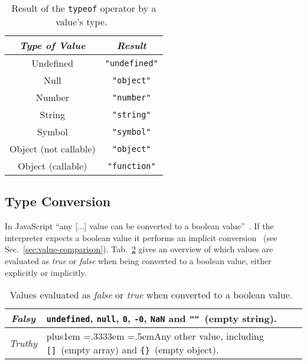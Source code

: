 \begin{table}[h]
\caption{Result of the \texttt{typeof} operator by a value's type.~\cite[p.~164]{ES6Spec:Ecma:2015}}
\label{tab:typeof}
\centering
  \setlength{\tabcolsep}{5mm}
  \def\arraystretch{1.25}
  \small
  \begin{tabular}{|c|c|}
    \hline
    \emph{Type of Value} & \emph{Result} \\
    \hline \hline
    Undefined & \texttt{"undefined"} \\
    \hline
    Null & \texttt{"object"} \\
    \hline
    Number & \texttt{"number"} \\
    \hline
    String & \texttt{"string"} \\
    \hline
    Symbol & \texttt{"symbol"} \\
    \hline
    Object (not callable) & \texttt{"object"} \\
    \hline
    Object (callable) & \texttt{"function"} \\
    \hline
  \end{tabular}
\end{table}

\subsection{Type Conversion}
\label{sec:type-conversion}

In JavaScript ``any [...] value can be converted to a boolean value''~\cite[p.~40]{JavaScriptTheDefinitiveGuide:Flanagan:2011}. If the interpreter expects a boolean value it performs an implicit conversion~\cite[p.~46]{JavaScriptTheDefinitiveGuide:Flanagan:2011} (see Sec.~\ref{sec:value-comparison}). Tab.~\ref{tab:truthy-falsy} gives an overview of which values are evaluated as \emph{true} or \emph{false} when being converted to a boolean value, either explicitly or implicitly.

\begin{table}[h]
\caption{Values evaluated as \emph{false} or \emph{true} when converted to a boolean value.~\cite[p.~40]{JavaScriptTheDefinitiveGuide:Flanagan:2011}}
\label{tab:truthy-falsy}
\centering
  \def\rr{\rightskip=0pt plus1em \spaceskip=.3333em \xspaceskip=.5em\relax}
  \setlength{\tabcolsep}{1ex}
  \def\arraystretch{1.20}
  \setlength{\tabcolsep}{1ex}
  \small
  \begin{tabular}{|c||l|}
    \hline
    \emph{Falsy} & \texttt{undefined}, \texttt{null}, \texttt{0}, \texttt{-0}, \texttt{NaN} and \texttt{""}~(empty string). \\
    \hline
    \emph{Truthy} & {\rr Any other value, including \texttt{[]}~(empty array) and \texttt{\{\}}~(empty object). } \\
    \hline
  \end{tabular}
\end{table}


